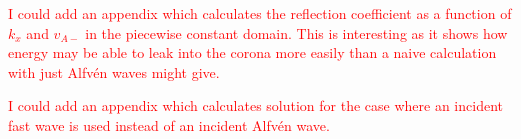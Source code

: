 \textcolor{red}{I could add an appendix which calculates the reflection coefficient as a function of $k_x$ and $v_{A-}$ in the piecewise constant domain. This is interesting as it shows how energy may be able to leak into the corona more easily than a naive calculation with just Alfv\'en waves might give.}

\textcolor{red}{I could add an appendix which calculates solution for the case where an incident fast wave is used instead of an incident Alfv\'en wave.}

